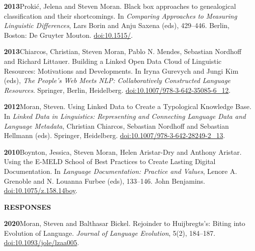 \documentclass[11pt]{article}
\newcommand{\hangpara}{
 \setlength{\parindent}{0in} %
 \hangindent=0.42in %
}
\begin{document}
\vskip 6pt
\hangpara
{\bf 2013}\hspace{1ex}Proki{\'c}, Jelena and Steven Moran. Black box approaches to genealogical classification and their shortcomings. In {\it Comparing Approaches to Measuring Linguistic Differences}, Lars Borin and Anju Saxena (eds), 429--446. Berlin, Boston: De Gruyter Mouton. \href{https://doi.org/10.1515/9783110305258.429}{doi:10.1515/}.

\vskip 6pt
\hangpara
{\bf 2013}\hspace{1ex}Chiarcos, Christian, Steven Moran, Pablo N. Mendes, Sebastian Nordhoff and Richard Littauer. Building a Linked Open Data Cloud of Linguistic Resources: Motivations and Developments. In Iryna Gurevych and Jungi Kim (eds), {\it The People's Web Meets NLP: Collaboratively Constructed Language Resources}. Springer, Berlin, Heidelberg. \href{https://doi.org/10.1007/978-3-642-35085-6_12}{doi:10.1007/978-3-642-35085-6\_12}.


\vskip 6pt
\hangpara
{\bf 2012}\hspace{1ex}Moran, Steven. Using Linked Data to Create a Typological Knowledge Base. In {\it Linked Data in Linguistics: Representing and Connecting Language Data and Language Metadata}, Christian Chiarcos, Sebastian Nordhoff and Sebastian Hellmann (eds). Springer, Heidelberg. \href{https://doi.org/10.1007/978-3-642-28249-2_13}{doi:10.1007/978-3-642-28249-2\_13}. %

\vskip 6pt
\hangpara
{\bf 2010}\hspace{1ex}Boynton, Jessica, Steven Moran, Helen Aristar-Dry and Anthony Aristar. Using the E-MELD School of Best Practices to Create Lasting Digital Documentation. In {\it Language Documentation: Practice and Values}, Lenore A. Grenoble and N. Louanna Furbee (eds), 133--146. John Benjamins. \href{https://doi.org/10.1075/z.158.14boy}{doi:10.1075/z.158.14boy}.



\vskip 20pt
\begin{flushleft}
{\bf RESPONSES}
\end{flushleft}

\hangpara
{\bf 2020}\hspace{1ex}Moran, Steven and Balthasar Bickel. Rejoinder to Huijbregts’s: Biting into Evolution of Language. \textit{Journal of Language Evolution}, 5(2), 184--187. \href{https://doi.org/10.1093/jole/lzaa005}{doi:10.1093/jole/lzaa005}.
\end{document}
